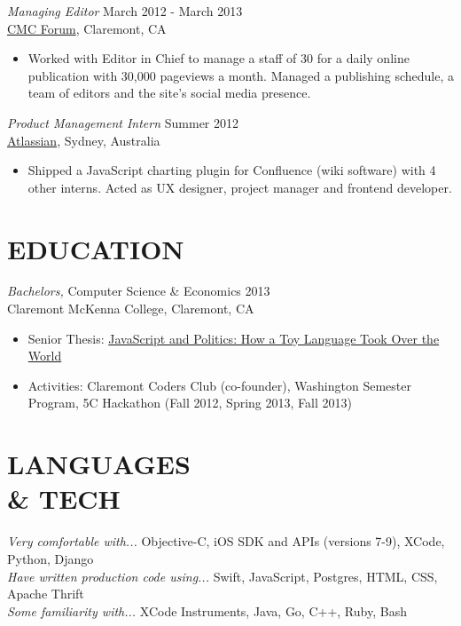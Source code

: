 \documentclass[margin, 10pt]{res}
\begin{document}
\begin{resume}
{\sl Managing Editor} \hfill March 2012 - March 2013 \\
\href{http://cmcforum.com/}{CMC Forum}, Claremont, CA
\begin{itemize}
\item Worked with Editor in Chief to manage a staff of 30 for a daily online publication with 30,000 pageviews a month. Managed a publishing schedule, a team of editors and the site's social media presence.
\end{itemize}

{\sl Product Management Intern} \hfill Summer 2012 \\
\href{https://www.atlassian.com/}{Atlassian}, Sydney, Australia
\begin{itemize}
\item Shipped a JavaScript charting plugin for Confluence (wiki software) with 4 other interns. Acted as UX designer, project manager and frontend developer.
\end{itemize}


\section{EDUCATION}

{\sl Bachelors,} Computer Science \& Economics \hfill 2013 \\
Claremont McKenna College, Claremont, CA
\begin{itemize} \itemsep -2pt %
\item Senior Thesis: \href{http://scholarship.claremont.edu/cmc_theses/758/}{JavaScript and Politics: How a Toy Language Took Over the World}
\item Activities: Claremont Coders Club (co-founder), Washington Semester Program, 5C Hackathon (Fall 2012, Spring 2013, Fall 2013)
\end{itemize}


\section{LANGUAGES \\ \& TECH }
{\sl Very comfortable with...} Objective-C, iOS SDK and APIs (versions 7-9), XCode, Python, Django \\
{\sl Have written production code using...} Swift, JavaScript, Postgres, HTML, CSS, Apache Thrift \\
{\sl Some familiarity with...} XCode Instruments, Java, Go, C++, Ruby, Bash


\end{resume}
\end{document}

